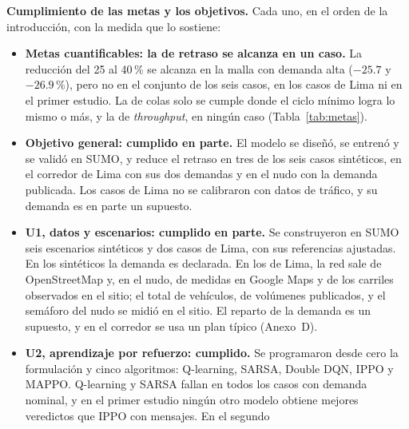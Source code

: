 \noindent\textbf{Cumplimiento de las metas y los objetivos.} Cada uno,
en el orden de la introducción, con la medida que lo sostiene:
\begin{itemize}
  \item \textbf{Metas cuantificables: la de retraso se alcanza en un
    caso.} La reducción del 25 al 40\,\% se alcanza en la malla con
    demanda alta ($-25.7$ y $-26.9$\,\%), pero no en el conjunto de los
    seis casos, en los casos de Lima ni en el primer estudio. La de colas
    solo se cumple donde el ciclo mínimo logra lo mismo o más, y la de
    \textit{throughput}, en ningún caso (Tabla~\ref{tab:metas}).
  \item \textbf{Objetivo general: cumplido en parte.} El modelo se
    diseñó, se entrenó y se validó en SUMO, y reduce el retraso en tres
    de los seis casos sintéticos, en el corredor de Lima con sus dos
    demandas y en el nudo con la demanda publicada. Los casos de Lima no
    se calibraron con datos de tráfico, y su demanda es en parte un
    supuesto.
  \item \textbf{U1, datos y escenarios: cumplido en parte.} Se
    construyeron en SUMO seis escenarios sintéticos y dos casos de Lima,
    con sus referencias ajustadas. En los sintéticos la demanda es
    declarada. En los de Lima, la red sale de OpenStreetMap y, en el
    nudo, de medidas en Google Maps y de los carriles observados en el
    sitio; el total de vehículos, de volúmenes publicados, y el semáforo
    del nudo se midió en el sitio. El reparto de la demanda es un
    supuesto, y en el corredor se usa un plan típico (Anexo~D).
  \item \textbf{U2, aprendizaje por refuerzo: cumplido.} Se programaron
    desde cero la formulación y cinco algoritmos: Q-learning, SARSA,
    Double DQN, IPPO y MAPPO. Q-learning y SARSA fallan en todos los
    casos con demanda nominal, y en el primer estudio ningún otro modelo
    obtiene mejores veredictos que IPPO con mensajes. En el segundo

\end{itemize}
